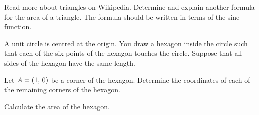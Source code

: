 \documentclass[a4paper,oneside,12pt]{article}
\begin{document}
\begin{problem}
\item Read more about triangles on Wikipedia.  Determine and explain
  another formula for the area of a triangle.  The formula should be
  written in terms of the sine function.

\item A unit circle is centred at the origin.  You draw a hexagon
  inside the circle such that each of the six points of the hexagon
  touches the circle.  Suppose that all sides of the hexagon have the
  same length.
  \begin{packedenum}
  \item\label{subprob:hexagon_coordinates}
    Let $A = \left\lparen{1},\, {0}\right\rparen$ be a corner of the hexagon.  Determine the
    coordinates of each of the remaining corners of the hexagon.

  \item\label{subprob:hexagon_area}
    Calculate the area of the hexagon.


\end{packedenum}
\end{problem}
\end{document}
